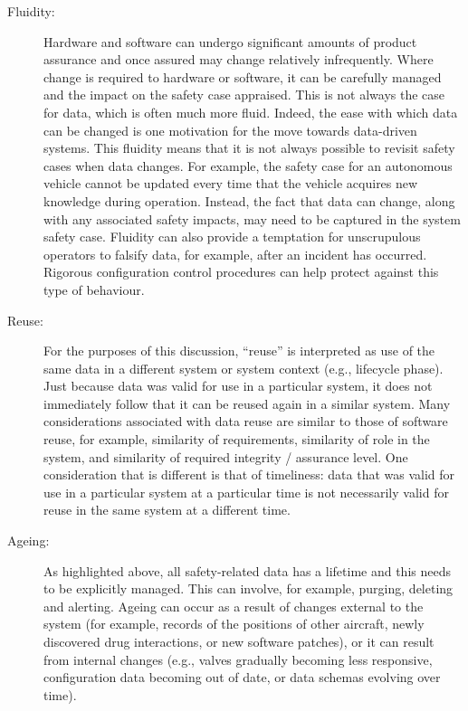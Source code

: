 \begin{description}
	\item[Fluidity:] Hardware and software can undergo significant amounts of product assurance and once assured may change relatively infrequently. Where change is required to hardware or software, it can be carefully managed and the impact on the safety case appraised. This is not always the case for data, which is often much more fluid. Indeed, the ease with which data can be changed is one motivation for the move towards \glspl{data-driven system}. This fluidity means that it is not always possible to revisit safety cases when data changes. For example, the safety case for an autonomous vehicle cannot be updated every time that the vehicle acquires new knowledge during operation. Instead, the fact that data can change, along with any associated safety impacts, may need to be captured in the system safety case. Fluidity can also provide a temptation for unscrupulous operators to falsify data, for example, after an incident has occurred. Rigorous configuration control procedures can help protect against this type of behaviour.
	
	\item[Reuse:] For the purposes of this discussion, ``reuse'' is interpreted as use of the same data in a different system or system context (e.g., lifecycle phase). Just because data was valid for use in a particular system, it does not immediately follow that it can be reused again in a similar system. Many considerations associated with data reuse are similar to those of software reuse, for example, similarity of requirements, similarity of role in the system, and similarity of required \gls{integrity} / assurance level. One consideration that is different is that of \gls{timeliness}: data that was valid for use in a particular system at a particular time is not necessarily valid for reuse in the same system at a different time.
	
	\item[Ageing:] As highlighted above, all safety-related data has a lifetime and this needs to be explicitly managed. This can involve, for example, purging, deleting and alerting. Ageing can occur as a result of changes external to the system (for example, records of the positions of other aircraft, newly discovered drug interactions, or new software patches), or it can result from internal changes (e.g., valves gradually becoming less responsive, \gls{configuration data} becoming out of date, or data schemas evolving over time).
	

\end{description}
